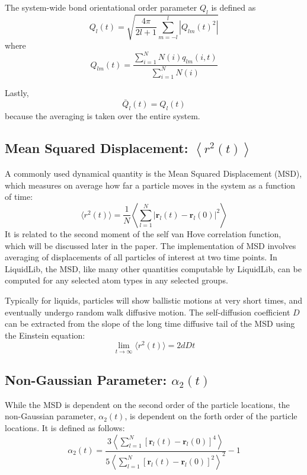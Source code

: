 \documentclass{article}
\begin{document}
The system-wide bond orientational order parameter $Q_l$ is defined as
\begin{equation}
	Q_l(t) = \sqrt{\frac{4\pi}{2l+1} \sum_{m=-l}^l\left|Q_{lm}(t)^2\right|}
\end{equation}
where 
\begin{equation}
	Q_{lm}(t) = \frac{\sum_{i=1}^NN(i)q_{lm}(i,t)}{\sum_{i=1}^NN(i)}
\end{equation}

Lastly,
\begin{equation}
	\bar{Q}_l(t) = Q_l(t)
\end{equation}
because the averaging is taken over the entire system.

\subsection{Mean Squared Displacement: $\left<r^2(t)\right>$} \label{sec::MSD}
A commonly used dynamical quantity is the Mean Squared Displacement (MSD), which measures on average how far a particle moves in the system as a function of time:
\begin{equation}
	\langle r^2(t)\rangle = \frac{1}{N}\left\langle\sum\limits_{l=1}^N |\mathbf{r}_l(t) - \mathbf{r}_l(0)|^2\right\rangle
\end{equation}
It is related to the second moment of the self van Hove correlation function, which will be discussed later in the paper. The implementation of MSD involves averaging of displacements of all particles of interest at two time points. In LiquidLib, the MSD, like many other quantities computable by LiquidLib, can be computed for any selected atom types in any selected groups. 

Typically for liquids, particles will show ballistic motions at very short times, and eventually undergo random walk diffusive motion. The self-diffusion coefficient $D$ can be extracted from the slope of the long time diffusive tail of the MSD using the Einstein equation:
\begin{equation}
	\lim_{t\rightarrow\infty} \langle r^2(t) \rangle = 2dDt
\end{equation}

\subsection{Non-Gaussian Parameter: $\alpha_2(t)$} \label{sec::alpha2}
While the MSD is dependent on the second order of the particle locations, the non-Gaussian parameter, $\alpha_2(t)$, is dependent on the forth order of the particle locations. It is defined as follows:
\begin{equation}
	\alpha_2(t) = \frac{3\left\langle\sum\limits_{l=1}^N[\mathbf{r}_l(t) - \mathbf{r}_l(0)]^4\right\rangle}{5\left\langle\sum\limits_{l=1}^N[\mathbf{r}_l(t) - \mathbf{r}_l(0)]^2\right\rangle^2} - 1
\end{equation}
\end{document}
